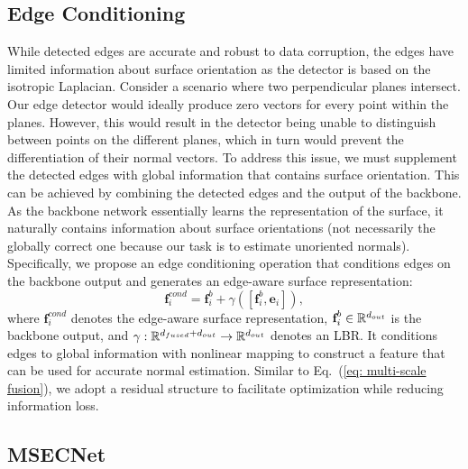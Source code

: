 \documentclass[sigconf]{acmart}
\begin{document}
\subsection{Edge Conditioning}\label{sec: edge conditioning}
While detected edges are accurate and robust to data corruption, the edges have limited information about surface orientation as the detector is based on the isotropic Laplacian.
Consider a scenario where two perpendicular planes intersect. Our edge detector would ideally produce zero vectors for every point within the planes. However, this would result in the detector being unable to distinguish between points on the different planes, which in turn would prevent the differentiation of their normal vectors.
To address this issue, we must supplement the detected edges with global information that contains surface orientation. This can be achieved by combining the detected edges and the output of the backbone. As the backbone network essentially learns the representation of the surface, it naturally contains information about surface orientations (not necessarily the globally correct one because our task is to estimate unoriented normals). 
Specifically, we propose an edge conditioning operation that conditions edges on the backbone output and generates an edge-aware surface representation:
\begin{equation}\label{eq: edge conditioning}
    \textbf{f}_i^{cond} = \textbf{f}^{b}_i + \gamma \left( \left[ \textbf{f}^{b}_i, \textbf{e}_i \right] \right),    
\end{equation}
where $\textbf{f}_i^{cond}$ denotes the edge-aware surface representation, $\textbf{f}_i^{b}\in\mathbb{R}^{d_{out}}$ is the backbone output, and $\gamma: \mathbb{R}^{d_{fused} + d_{out}} \to \mathbb{R}^{d_{out}}$ denotes an LBR. It conditions edges to global information with nonlinear mapping to construct a feature that can be used for accurate normal estimation. Similar to Eq.~(\ref{eq: multi-scale fusion}), we adopt a residual structure to facilitate optimization while reducing information loss.   


\subsection{MSECNet}\label{sec: arch}
\indent 
\end{document}
